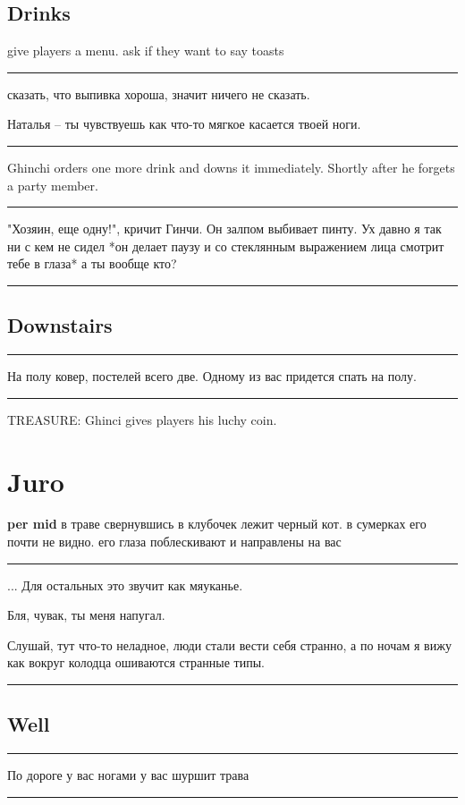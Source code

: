 \documentclass[a5paper,11pt]{book}
\newenvironment{boxed}
{\em\noindent\rule[1ex]{\linewidth}{0.1pt}\linebreak\indent}
{\par\noindent\rule[1ex]{\linewidth}{0.1pt}}
\begin{document}
\begin{multicols}{2}
\subsection{Drinks}

give players a menu. ask if they want to say toasts

\begin{boxed}
сказать, что выпивка хороша, значит ничего не сказать.

Наталья -- ты чувствуешь как что-то мягкое касается твоей ноги.
\end{boxed}

Ghinchi orders one more drink and downs it immediately. Shortly after he forgets a  party member.

\begin{boxed}
"Хозяин, еще одну!", кричит Гинчи. Он залпом выбивает пинту. Ух давно я так ни с кем не сидел *он делает паузу и со стеклянным выражением лица смотрит тебе в глаза* а ты вообще кто?
\end{boxed}

\subsection{Downstairs}

\begin{boxed}
На полу ковер, постелей всего две. Одному из вас придется спать на полу.
\end{boxed}
 
TREASURE: Ghinci gives players his luchy coin.

\section{Juro}
\textbf{per mid} в траве свернувшись в клубочек лежит черный кот. в сумерках его почти не видно. его глаза поблескивают и направлены на вас

\begin{boxed}
  ... Для остальных это звучит как мяуканье. 

  Бля, чувак, ты меня напугал.

  Слушай, тут что-то неладное, люди стали вести себя странно, а по ночам я вижу как вокруг колодца ошиваются странные типы.
\end{boxed}

\subsection{Well}
\begin{boxed}
  По дороге у вас ногами у вас шуршит трава


\end{boxed}
\end{multicols}
\end{document}
